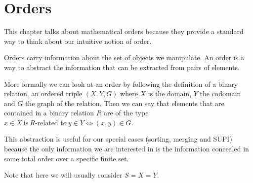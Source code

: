 \section{Orders}

This chapter talks about mathematical orders because they provide a standard
way to think about our intuitive notion of order.

Orders carry information about the set of objects we manipulate. An order is a
way to abstract the information that can be extracted from pairs of elements.

More formally we can look at an order by following the definition of a binary
relation, an ordered triple $(X, Y, G)$ where $X$ is the domain, $Y$ the
codomain and $G$ the graph of the relation.
Then we can say that elements that are contained in a binary relation $R$ are
of the type $x \in X~\text{is}~R\text{-related to}~y \in Y \iff (x, y) \in G$.

This abstraction is useful for our special cases (sorting, merging and SUPI)
because the only information we are interested in is the information concealed
in some total order over a specific finite set.

Note that here we will usually consider $S = X = Y$.
